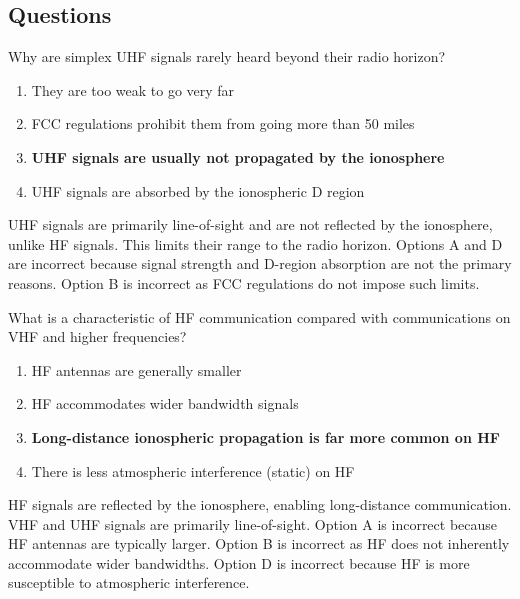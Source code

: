 \subsection*{Questions}
\begin{tcolorbox}[colback=gray!10!white,colframe=black!75!black,title={T3C01}]
    Why are simplex UHF signals rarely heard beyond their radio horizon?
    \begin{enumerate}[label=\Alph*),noitemsep]
        \item They are too weak to go very far
        \item FCC regulations prohibit them from going more than 50 miles
        \item \textbf{UHF signals are usually not propagated by the ionosphere}
        \item UHF signals are absorbed by the ionospheric D region
    \end{enumerate}
\end{tcolorbox}
UHF signals are primarily line-of-sight and are not reflected by the ionosphere, unlike HF signals. This limits their range to the radio horizon. Options A and D are incorrect because signal strength and D-region absorption are not the primary reasons. Option B is incorrect as FCC regulations do not impose such limits.


\begin{tcolorbox}[colback=gray!10!white,colframe=black!75!black,title={T3C02}]
    What is a characteristic of HF communication compared with communications on VHF and higher frequencies?
    \begin{enumerate}[label=\Alph*),noitemsep]
        \item HF antennas are generally smaller
        \item HF accommodates wider bandwidth signals
        \item \textbf{Long-distance ionospheric propagation is far more common on HF}
        \item There is less atmospheric interference (static) on HF
    \end{enumerate}
\end{tcolorbox}
HF signals are reflected by the ionosphere, enabling long-distance communication. VHF and UHF signals are primarily line-of-sight. Option A is incorrect because HF antennas are typically larger. Option B is incorrect as HF does not inherently accommodate wider bandwidths. Option D is incorrect because HF is more susceptible to atmospheric interference.

